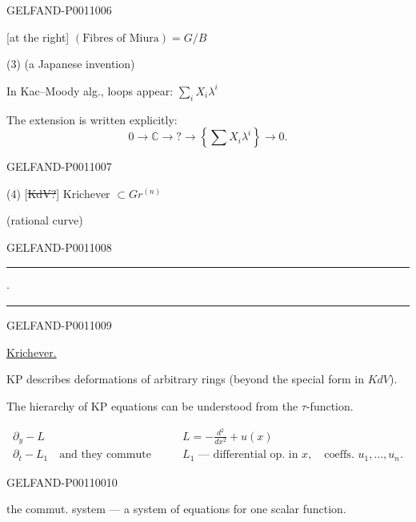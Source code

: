\begin{GelfandAdjacentEvidence}{GELFAND-P001100}{6}

[at the right] $(\text{Fibres of Miura})=G/B$

(3)  (a Japanese invention)


In Kac–Moody alg., loops appear: $\displaystyle\sum_i X_i\lambda^i$

The extension is written explicitly:
\[
0\to\mathbb C\to ?\to\left\{\sum X_i\lambda^i\right\}\to0.
\]
\end{GelfandAdjacentEvidence}
\begin{GelfandAdjacentEvidence}{GELFAND-P001100}{7}


(4) [\sout{KdV?}] Krichever $\subset Gr^{(n)}$

(rational curve)
\end{GelfandAdjacentEvidence}
\begin{GelfandAdjacentEvidence}{GELFAND-P001100}{8}


\begin{center}\rule{12mm}{0.3pt}\quad $\cdot$\quad\rule{12mm}{0.3pt}\end{center}
\end{GelfandAdjacentEvidence}
\begin{GelfandAdjacentEvidence}{GELFAND-P001100}{9}


\underline{Krichever.}

KP describes deformations of arbitrary rings (beyond the special form in $KdV$).

The hierarchy of KP equations can be understood from the $\tau$-function.

\[
\begin{aligned}
\partial_y-L &\qquad L=-\frac{d^2}{dx^2}+u(x)\\
\partial_t-L_1\quad\text{and they commute}
 &\qquad L_1\text{ — differential op. in }x,\quad\text{coeffs. }u_1,\ldots,u_n.
\end{aligned}
\]
\end{GelfandAdjacentEvidence}
\begin{GelfandAdjacentEvidence}{GELFAND-P001100}{10}


 the commut. system — a system of equations for one scalar function.
\end{GelfandAdjacentEvidence}
